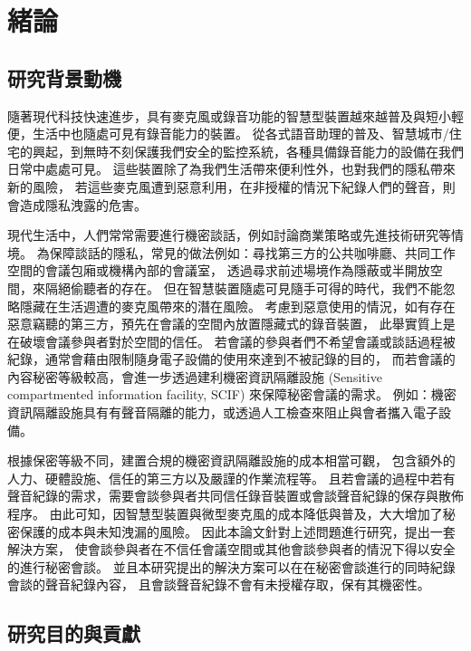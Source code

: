 \chapter{緒論}\label{chapter:intro}

\section{研究背景動機}\label{section:intro-background}

    隨著現代科技快速進步，具有麥克風或錄音功能的智慧型裝置越來越普及與短小輕便，生活中也隨處可見有錄音能力的裝置。
從各式語音助理的普及、智慧城市/住宅的興起，到無時不刻保護我們安全的監控系統，各種具備錄音能力的設備在我們日常中處處可見。
這些裝置除了為我們生活帶來便利性外，也對我們的隱私帶來新的風險，
若這些麥克風遭到惡意利用，在非授權的情況下紀錄人們的聲音，則會造成隱私洩露的危害。

    現代生活中，人們常常需要進行機密談話，例如討論商業策略或先進技術研究等情境。
為保障談話的隱私，常見的做法例如：尋找第三方的公共咖啡廳、共同工作空間的會議包廂或機構內部的會議室，
透過尋求前述場境作為隱蔽或半開放空間，來隔絕偷聽者的存在。
但在智慧裝置隨處可見隨手可得的時代，我們不能忽略隱藏在生活週遭的麥克風帶來的潛在風險。
考慮到惡意使用的情況，如有存在惡意竊聽的第三方，預先在會議的空間內放置隱藏式的錄音裝置，
此舉實質上是在破壞會議參與者對於空間的信任。
若會議的參與者們不希望會議或談話過程被紀錄，通常會藉由限制隨身電子設備的使用來達到不被記錄的目的，
而若會議的內容秘密等級較高，會進一步透過建利機密資訊隔離設施
(Sensitive compartmented information facility, SCIF) 來保障秘密會議的需求。
例如：機密資訊隔離設施具有有聲音隔離的能力，或透過人工檢查來阻止與會者攜入電子設備。

    根據保密等級不同，建置合規的機密資訊隔離設施的成本相當可觀，
包含額外的人力、硬體設施、信任的第三方以及嚴謹的作業流程等。
且若會議的過程中若有聲音紀錄的需求，需要會談參與者共同信任錄音裝置或會談聲音紀錄的保存與散佈程序。
由此可知，因智慧型裝置與微型麥克風的成本降低與普及，大大增加了秘密保護的成本與未知洩漏的風險。
因此本論文針對上述問題進行研究，提出一套解決方案，
使會談參與者在不信任會議空間或其他會談參與者的情況下得以安全的進行秘密會談。
並且本研究提出的解決方案可以在在秘密會談進行的同時紀錄會談的聲音紀錄內容，
且會談聲音紀錄不會有未授權存取，保有其機密性。


\section{研究目的與貢獻}\label{section:intro-purpose}

